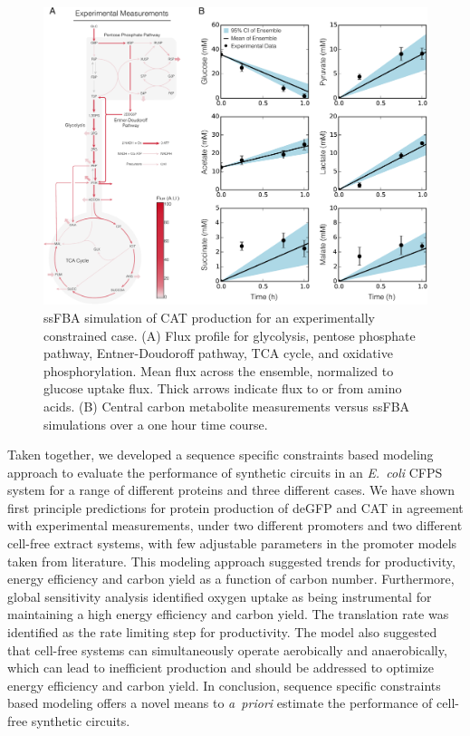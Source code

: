 \documentclass[journal=asbcd6,manuscript=article]{achemso}
\begin{document}
\begin{figure}[t!]
\includegraphics[width=1.00\textwidth]{./Figures/ssFBA_exp.pdf}
\caption{ssFBA simulation of CAT production for an experimentally constrained case. (A) Flux profile for glycolysis, pentose phosphate pathway, Entner-Doudoroff pathway, TCA cycle, and oxidative phosphorylation.  Mean flux across the ensemble, normalized to glucose uptake flux. Thick arrows indicate flux to or from amino acids. (B) Central carbon metabolite measurements versus ssFBA simulations over a one hour time course.}
\label{fig:flux_exp}
\end{figure}

Taken together, we developed a sequence specific constraints based modeling approach to evaluate the performance of synthetic circuits in an \emph{E.~coli} CFPS system for a range of different proteins and three different cases.
We have shown first principle predictions for protein production of deGFP and CAT in agreement with experimental measurements, under two different promoters and two different cell-free extract systems, with few adjustable parameters in the promoter models taken from literature.
This modeling approach suggested trends for productivity, energy efficiency and carbon yield as a function of carbon number.
Furthermore, global sensitivity analysis identified oxygen uptake as being instrumental for maintaining a high energy efficiency and carbon yield.
The translation rate was identified as the rate limiting step for productivity.
The model also suggested that cell-free systems can simultaneously operate aerobically and anaerobically, which can lead to inefficient production and should be addressed to optimize energy efficiency and carbon yield.
In conclusion, sequence specific constraints based modeling offers a novel means to \emph{a~priori} estimate the performance of cell-free synthetic circuits.
\end{document}
